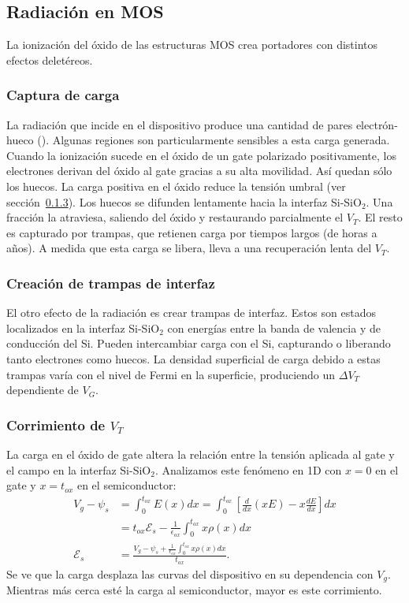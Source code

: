 \subsection{Radiación en MOS}
La ionización del óxido de las estructuras MOS crea portadores 
con distintos efectos deletéreos. 
\subsubsection{Captura de carga}
La radiación que incide en el dispositivo 
produce una cantidad de pares electrón-hueco ().
Algunas regiones son particularmente sensibles a esta carga generada.
Cuando la ionización sucede en el óxido de un gate polarizado positivamente,
los electrones derivan del óxido al gate gracias a su alta movilidad.
Así quedan sólo los huecos.
La carga positiva en el óxido reduce la tensión umbral 
(ver sección~\ref{corrimientovt}).
Los huecos se difunden lentamente hacia la interfaz Si-SiO$_2$.
Una fracción la atraviesa, 
saliendo del óxido y restaurando parcialmente el $V_T$.
El resto es capturado por trampas,
que retienen carga por tiempos largos (de horas a años).
A medida que esta carga se libera, 
lleva a una recuperación lenta del $V_T$.
\subsubsection{Creación de trampas de interfaz}
El otro efecto de la radiación es crear trampas de interfaz.
Estos son estados localizados en la interfaz Si-SiO$_2$ con
energías entre la banda de valencia y de conducción del Si.
Pueden intercambiar carga con el Si,
capturando o liberando tanto electrones como huecos.
La densidad superficial de carga debido a estas trampas varía con el nivel de
Fermi en la superficie, produciendo un $\Delta V_T$ dependiente de $V_G$.
\subsubsection{Corrimiento de $V_T$}
\label{corrimientovt}
La carga en el óxido de gate altera la relación 
entre la tensión aplicada al gate y el campo en la interfaz Si-SiO$_2$.
Analizamos este fenómeno en 1D con $x=0$ en el gate y $x=t_{ox}$
en el semiconductor:
\begin{align*}
    V_g-\psi_s&=\int_0^{t_{ox}}E(x)dx=
    \int_0^{t_{ox}}\left[\frac d{dx}(xE)-x\frac{dE}{dx}\right]dx\\
    &=t_{ox}\mathscr{E}_s-\frac 1{\epsilon_{ox}}\int_0^{t_{ox}}x\rho(x)dx\\
    \mathscr{E}_s &= \frac{V_g-\psi_s+
        \frac 1{\epsilon_{ox}}\int_0^{t_{ox}}x\rho(x)dx}{t_{ox}}.
\end{align*}
Se ve que la carga desplaza las curvas del dispositivo 
en su dependencia con $V_g$.
Mientras más cerca esté la carga al semiconductor,
mayor es este corrimiento.

